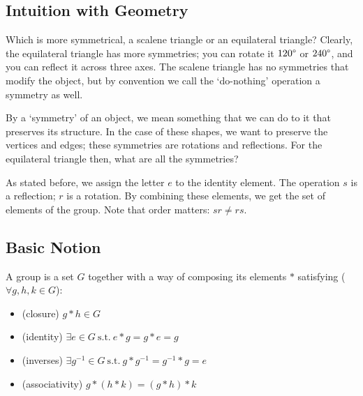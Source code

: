 \subsection{Intuition with Geometry}
Which is more symmetrical, a scalene triangle or an equilateral triangle? Clearly, the equilateral triangle has more symmetries; you can rotate it $120\degree$ or $240\degree$, and you can reflect it across three axes. The scalene triangle has no symmetries that modify the object, but by convention we call the `do-nothing' operation a symmetry as well.

By a `symmetry' of an object, we mean something that we can do to it that preserves its structure. In the case of these shapes, we want to preserve the vertices and edges; these symmetries are rotations and reflections. For the equilateral triangle then, what are all the symmetries?


As stated before, we assign the letter $e$ to the identity element. The operation $s$ is a reflection; $r$ is a rotation. By combining these elements, we get the set of elements of the group. Note that order matters: $sr\neq rs$.

\subsection{Basic Notion}
\begin{definition}[Group]
	A group is a set $G$ together with a way of composing its elements $\ast$ satisfying ($\forall g, h, k \in G$):
	\begin{itemize}
		\item (closure) $g \ast h \in G$
		\item (identity) $\exists e \in G \mathrm{\ s.t.\ } e \ast g = g \ast e = g$
		\item (inverses) $\exists g^{-1} \in G \mathrm{\ s.t.\ } g \ast g^{-1} = g^{-1} \ast g = e$
		\item (associativity) $g \ast (h \ast k) = (g \ast h) \ast k$
	\end{itemize}
\end{definition}

